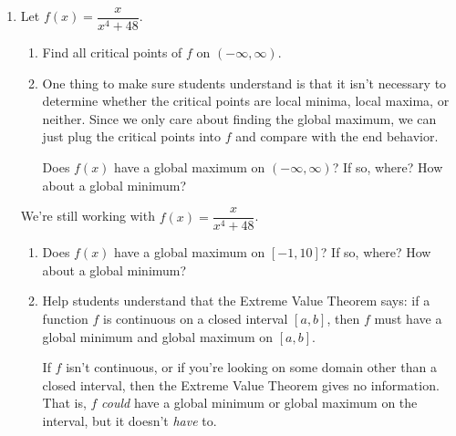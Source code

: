 \documentclass{article}
\begin{document}
\begin{enumerate}
\item  

  Let $f(x) = \dfrac{x}{x^4 + 48}$.
  \begin{enumerate}
  \item
    \begin{problem}[\vfill]
      Find all critical points of $f$ on $(-\infty, \infty)$.
    \end{problem}

  \item

    \begin{workshop}
      One thing to make sure students understand is that it isn't necessary to determine whether the critical points are local minima, local maxima, or neither. Since we only care about finding the global maximum, we can just plug the critical points into $f$ and compare with the end behavior.
    \end{workshop}

    \begin{problem}[\nstretch{0.75}]
      Does $f(x)$ have a global maximum on $(-\infty, \infty)$? If so, where? How about a global minimum?
    \end{problem}

  \end{enumerate}

  \begin{problemonly}
    We're still working with $f(x) = \dfrac{x}{x^4 + 48}$.
  \end{problemonly}

  \begin{enumerate}[resume]
  \item
    \begin{problem}[\vfill]
      Does $f(x)$ have a global maximum on $[-1, 10]$? If so, where? How about a global minimum?
    \end{problem}

  \item

    \begin{workshop}
      Help students understand that the Extreme Value Theorem says: if a function $f$ is continuous on a closed interval $[a, b]$, then $f$ must have a global minimum and global maximum on $[a, b]$.

      If $f$ isn't continuous, or if you're looking on some domain other than a closed interval, then the Extreme Value Theorem gives no information. That is, $f$ \emph{could} have a global minimum or global maximum on the interval, but it doesn't \emph{have} to.      
    \end{workshop}


\end{enumerate}
\end{enumerate}
\end{document}

